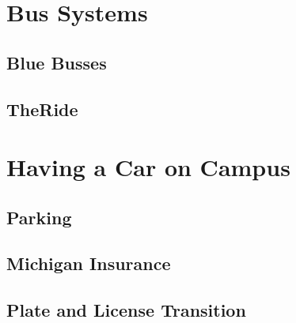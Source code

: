 \documentclass[
]{book}
\begin{document}
\hypertarget{bus-systems}{%
\section{Bus Systems}\label{bus-systems}}

\hypertarget{blue-busses}{%
\subsection{Blue Busses}\label{blue-busses}}

\hypertarget{theride}{%
\subsection{TheRide}\label{theride}}

\hypertarget{having-a-car-on-campus}{%
\section{Having a Car on Campus}\label{having-a-car-on-campus}}

\hypertarget{parking}{%
\subsection{Parking}\label{parking}}

\hypertarget{michigan-insurance}{%
\subsection{Michigan Insurance}\label{michigan-insurance}}

\hypertarget{plate-and-license-transition}{%
\subsection{Plate and License Transition}\label{plate-and-license-transition}}

  
\end{document}
